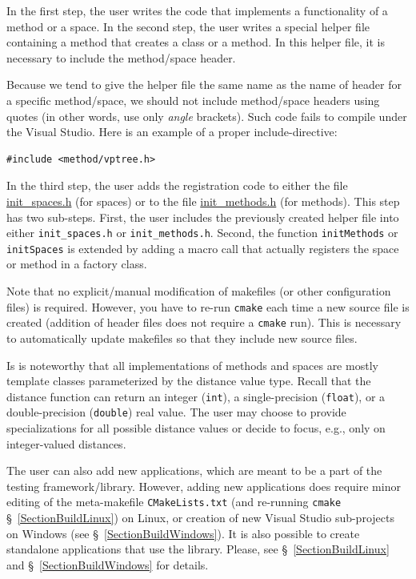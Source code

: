 \documentclass[runningheads,a4paper]{llncs}
\newcommand{\replocfile}{https://github.com/searchivarius/NonMetricSpaceLib/blob/pserv/}
\newcommand{\ttt}[1]{\texttt{#1}}
\begin{document}
In the first step, the user writes the code that implements a
functionality of a method or a space.
In the second step, the user writes a special helper file  
containing a method that creates a class or a method.
In this helper file, it is necessary to include
the method/space header. 

Because we tend to give the helper file the same name
as the name of header for a specific method/space,
we should not include method/space headers using quotes (in other words,
use only \emph{angle} brackets).
Such code fails to compile under the Visual Studio. 
Here is an example of a proper include-directive:
\begin{verbatim}
#include <method/vptree.h>
\end{verbatim}


In the third step, the user adds 
the registration code to either the file 
\href{\replocfile similarity_search/include/factory/init_spaces.h}{init\_spaces.h} (for spaces)
or to the file
\href{\replocfile similarity_search/include/factory/init_methods.h}{init\_methods.h} (for methods).
This step has two sub-steps. 
First, the user includes the previously created helper file into either
\ttt{init\_spaces.h} or \ttt{init\_methods.h}.
Second, the function \ttt{initMethods} or \ttt{initSpaces} is extended
by adding a macro call that actually registers the space or method in a factory class.

Note that no explicit/manual modification of makefiles (or other configuration files) is required.
However, you have to re-run \ttt{cmake} each time a new source file is created (addition
of header files does not require a \ttt{cmake} run). This is necessary to automatically update makefiles so that they include new source files.

Is is noteworthy that all implementations of methods and spaces
are mostly template classes parameterized by the distance value type.
Recall that the distance function can return an integer (\ttt{int}), 
a single-precision (\ttt{float}), or a double-precision (\ttt{double}) real value.
The user may choose to provide specializations for all possible
distance values or decide to focus, e.g., only on integer-valued distances.

The user can also add new applications, which are meant to be 
a part of the testing framework/library.
However, adding new applications does require minor editing of the meta-makefile \ttt{CMakeLists.txt} 
(and re-running \ttt{cmake} \S~\ref{SectionBuildLinux}) on Linux,
or creation of new Visual Studio sub-projects on Windows (see \S~\ref{SectionBuildWindows}).
It is also possible to create standalone applications that use the library.
Please, see \S~\ref{SectionBuildLinux} and \S~\ref{SectionBuildWindows} for details.
\end{document}
